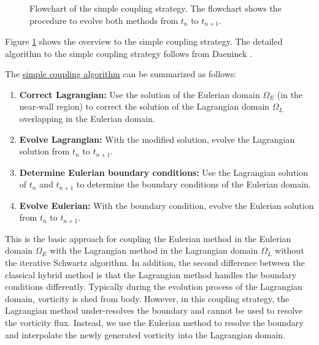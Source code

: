 	\begin{figure}[!b]
		\centering
		\caption{Flowchart of the simple coupling strategy. The flowchart shows the procedure to evolve both methods from $t_n$ to $t_{n+1}$.}
		\label{fig:flowchart_simpleCoupling}
	\end{figure}

Figure \ref{fig:flowchart_simpleCoupling} shows the overview to the simple coupling strategy. The detailed algorithm to the simple coupling strategy follows from Daeninck \cite{Daeninck2006}.

The \underline{simple coupling algorithm} can be summarized as follows:

	\begin{enumerate}
	\item \textbf{Correct Lagrangian:} Use the solution of the Eulerian domain $\Omega_E$ (in the near-wall region) to correct the solution of the Lagrangian domain $\Omega_L$ overlapping in the Eulerian domain.  
	\item \textbf{Evolve Lagrangian:} With the modified solution, evolve the Lagrangian solution from $t_n$ to $t_{n+1}$.
	\item \textbf{Determine Eulerian boundary conditions:} Use the Lagrangian solution of $t_n$ and $t_{n+1}$ to determine the boundary conditions of the Eulerian domain.
	\item \textbf{Evolve Eulerian:} With the boundary condition, evolve the Eulerian solution from $t_n$ to $t_{n+1}$.
	\end{enumerate}
	
This is the basic approach for coupling the Eulerian method in the Eulerian domain $\Omega_E$ with the Lagrangian method in the Lagrangian domain $\Omega_L$ without the iterative Schwartz algorithm. In addition, the second difference between the classical hybrid method is that the Lagrangian method handles the boundary conditions differently. Typically during the evolution process of the Lagrangian domain, vorticity is shed from body. However, in this coupling strategy, the Lagrangian method under-resolves the boundary and cannot be used to resolve the vorticity flux. Instead, we use the Eulerian method to resolve the boundary and interpolate the newly generated vorticity into the Lagrangian domain.

